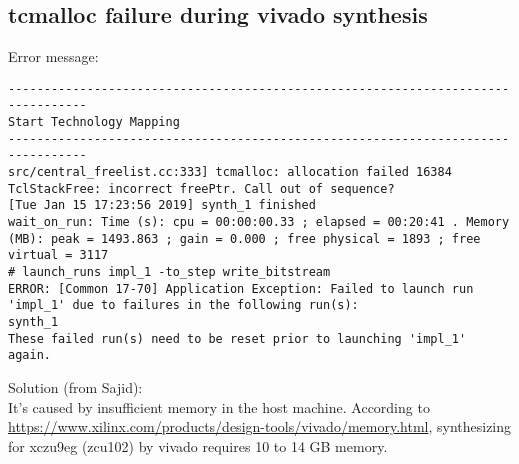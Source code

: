 \documentclass[a4paper,11pt]{article}
\begin{document}
\subsection{tcmalloc failure during vivado synthesis}
Error message:
\begin{lstlisting}
---------------------------------------------------------------------------------
Start Technology Mapping
---------------------------------------------------------------------------------
src/central_freelist.cc:333] tcmalloc: allocation failed 16384 
TclStackFree: incorrect freePtr. Call out of sequence?
[Tue Jan 15 17:23:56 2019] synth_1 finished
wait_on_run: Time (s): cpu = 00:00:00.33 ; elapsed = 00:20:41 . Memory (MB): peak = 1493.863 ; gain = 0.000 ; free physical = 1893 ; free virtual = 3117
# launch_runs impl_1 -to_step write_bitstream
ERROR: [Common 17-70] Application Exception: Failed to launch run 'impl_1' due to failures in the following run(s):
synth_1
These failed run(s) need to be reset prior to launching 'impl_1' again.
\end{lstlisting}

Solution (from Sajid):\\
It's caused by insufficient memory in the host machine.
According to \url{https://www.xilinx.com/products/design-tools/vivado/memory.html}, synthesizing for xczu9eg (zcu102) by vivado requires 10 to 14 GB memory.  
\end{document}
